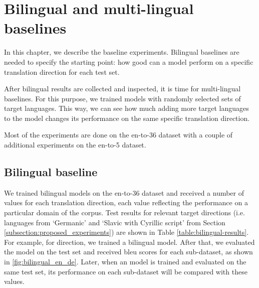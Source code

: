 \chapter{Bilingual and multi-lingual baselines}
\label{section:experiment_base}

In this chapter, we describe the baseline experiments.
Bilingual baselines are needed to specify the starting point:
how good can a model perform on a specific translation direction
for each test set.

After bilingual results are collected and inspected, it is time for
multi-lingual baselines. For this purpose, we trained models
with randomly selected sets of target languages.
This way, we can see how much adding more target languages to the model
changes its performance on the same specific translation direction.

Most of the experiments are done on the \gls{en-to-36} dataset with
a couple of additional experiments on the \gls{en-to-5} dataset.


\section{Bilingual baseline}
\label{section:experiment_bilingual_baseline}

We trained bilingual models on the \gls{en-to-36} dataset and received
a number of values for each translation direction, each value reflecting
the performance on a particular domain of the corpus.
Test results for relevant target directions (i.e. languages from
`Germanic' and `Slavic with Cyrillic script'
from Section \ref{subsection:proposed_experiments})
are shown in Table \ref{table:bilingual-results}.
For example, for  direction, we trained a bilingual model.
After that, we evaluated the model on the test set and received
\acrshort{bleu} scores for each sub-dataset, as shown
in \cref{fig:bilingual_en_de}.
Later, when an  model is trained and evaluated
on the same test set, its  performance on each sub-dataset
will be compared with these values.

